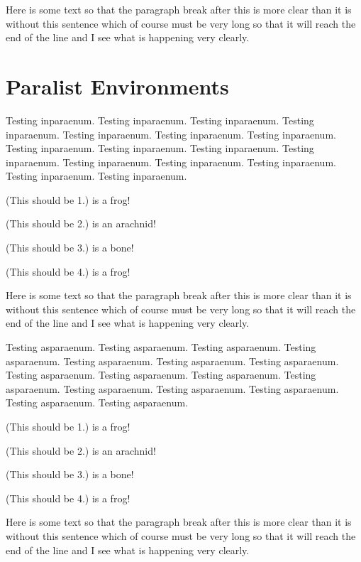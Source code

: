 \documentclass{article}
\begin{document}
Here is some text so that the paragraph break after this
is more clear than it is without this sentence which of
course must be very long so that it will reach the end of
the line and I see what is happening very clearly.

\section{Paralist Environments}

Testing inparaenum. Testing inparaenum. Testing inparaenum. Testing inparaenum.
Testing inparaenum. Testing inparaenum. Testing inparaenum. Testing inparaenum.
Testing inparaenum. Testing inparaenum. Testing inparaenum. Testing inparaenum.
Testing inparaenum. Testing inparaenum. Testing inparaenum. Testing inparaenum.
\begin{inparaenum}
\item (This should be 1.) is a frog!
\item (This should be 2.) is an arachnid!
\item (This should be 3.) is a bone!
\item (This should be 4.) is a frog!
\end{inparaenum}
Here is some text so that the paragraph break after this
is more clear than it is without this sentence which of
course must be very long so that it will reach the end of
the line and I see what is happening very clearly.

Testing asparaenum. Testing asparaenum. Testing asparaenum. Testing asparaenum.
Testing asparaenum. Testing asparaenum. Testing asparaenum. Testing asparaenum.
Testing asparaenum. Testing asparaenum. Testing asparaenum. Testing asparaenum.
Testing asparaenum. Testing asparaenum. Testing asparaenum. Testing asparaenum.
\begin{asparaenum}
\item (This should be 1.) is a frog!
\item (This should be 2.) is an arachnid!
\item (This should be 3.) is a bone!
\item (This should be 4.) is a frog!
\end{asparaenum}
Here is some text so that the paragraph break after this
is more clear than it is without this sentence which of
course must be very long so that it will reach the end of
the line and I see what is happening very clearly.
\end{document}
